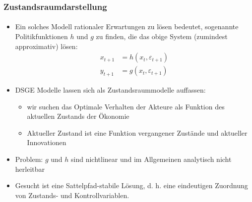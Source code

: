 \documentclass[10pt]{beamer}  %
\begin{document}
\begin{frame}\frametitle{Zustandsraumdarstellung}\framesubtitle{}
\begin{itemize}
\item Ein solches Modell rationaler Erwartungen zu l\"{o}sen bedeutet, sogenannte Politikfunktionen $h$ und $g$ zu finden, die das obige System (zumindest approximativ) l\"{o}sen:
\begin{align}
  x_{t+1} &= h(x_t,\varepsilon_{t+1})\\
  y_{t+1} &= g(x_t,\varepsilon_{t+1})
\end{align}
\item DSGE Modelle lassen sich als Zustandsraummodelle auffassen:
\begin{itemize}
\item wir suchen das Optimale Verhalten der Akteure als Funktion des aktuellen Zustands der \"{O}konomie
\item Aktueller Zustand ist eine Funktion vergangener Zust\"{a}nde und aktueller Innovationen
\end{itemize}
\item Problem: $g$ und $h$ sind nichtlinear und im Allgemeinen analytisch nicht herleitbar
\item Gesucht ist eine Sattelpfad-stabile L\"{o}sung, d. h. eine eindeutigen Zuordnung von Zustands- und Kontrollvariablen.
\end{itemize}

\end{frame}
\end{document}

